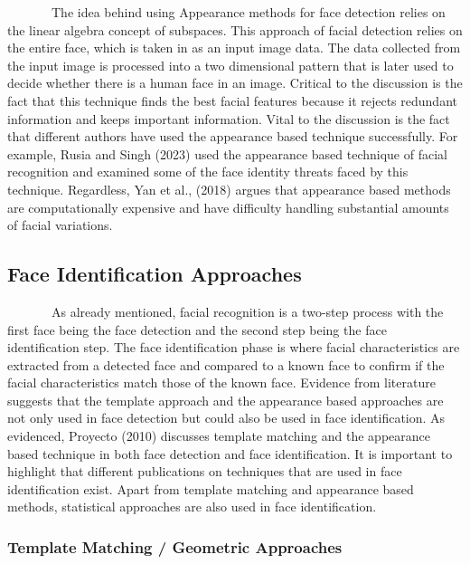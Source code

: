 \documentclass[
  12pt,
]{report}
\begin{document}
~~~~~~~The idea behind using Appearance methods for face detection
relies on the linear algebra concept of subspaces. This approach of
facial detection relies on the entire face, which is taken in as an
input image data. The data collected from the input image is processed
into a two dimensional pattern that is later used to decide whether
there is a human face in an image. Critical to the discussion is the
fact that this technique finds the best facial features because it
rejects redundant information and keeps important information. Vital to
the discussion is the fact that different authors have used the
appearance based technique successfully. For example, Rusia and Singh
(2023) used the appearance based technique of facial recognition and
examined some of the face identity threats faced by this technique.
Regardless, Yan et al., (2018) argues that appearance based methods are
computationally expensive and have difficulty handling substantial
amounts of facial variations.

\subsection{Face Identification
Approaches}\label{face-identification-approaches}

~~~~~~~As already mentioned, facial recognition is a two-step process
with the first face being the face detection and the second step being
the face identification step. The face identification phase is where
facial characteristics are extracted from a detected face and compared
to a known face to confirm if the facial characteristics match those of
the known face. Evidence from literature suggests that the template
approach and the appearance based approaches are not only used in face
detection but could also be used in face identification. As evidenced,
Proyecto (2010) discusses template matching and the appearance based
technique in both face detection and face identification. It is
important to highlight that different publications on techniques that
are used in face identification exist. Apart from template matching and
appearance based methods, statistical approaches are also used in face
identification.

\subsubsection{\texorpdfstring{Template Matching / Geometric
Approaches\\
}{Template Matching / Geometric Approaches }}\label{template-matching-geometric-approaches}
\end{document}
